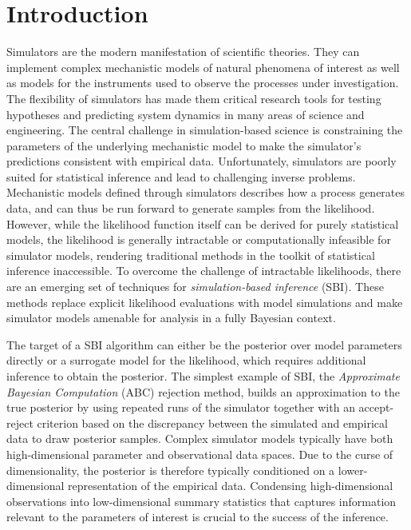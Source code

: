 \section{Introduction}\label{sec:Introduction}

Simulators are the modern manifestation of scientific theories. They can implement complex mechanistic models of natural phenomena of interest as well as models for the instruments used to observe the processes under investigation. The flexibility of simulators has made them critical research tools for testing hypotheses and predicting system dynamics in many areas of science and engineering. The central challenge in simulation-based science is constraining the parameters of the underlying mechanistic model to make the simulator's predictions consistent with empirical data. Unfortunately, simulators are poorly suited for statistical inference and lead to challenging inverse problems. Mechanistic models defined through simulators describes how a process generates data, and can thus be run forward to generate samples from the likelihood. However, while the likelihood function itself can be derived for purely statistical models, the likelihood is generally intractable or computationally infeasible for simulator models, rendering traditional methods in the toolkit of statistical inference inaccessible. To overcome the challenge of intractable likelihoods, there are an emerging set of techniques for \textit{simulation-based inference} (SBI). These methods replace explicit likelihood evaluations with model simulations and make simulator models amenable for analysis in a fully Bayesian context.

The target of a SBI algorithm can either be the posterior over model parameters directly or a surrogate model for the likelihood, which requires additional inference to obtain the posterior. The simplest example of SBI, the \textit{Approximate Bayesian Computation} (ABC) rejection method, builds an approximation to the true posterior by using repeated runs of the simulator together with an accept-reject criterion based on the discrepancy between the simulated and empirical data to draw posterior samples. Complex simulator models typically have both high-dimensional parameter and observational data spaces. Due to the curse of dimensionality, the posterior is therefore typically conditioned on a lower-dimensional representation of the empirical data. Condensing high-dimensional observations into low-dimensional summary statistics that captures information relevant to the parameters of interest is crucial to the success of the inference.

